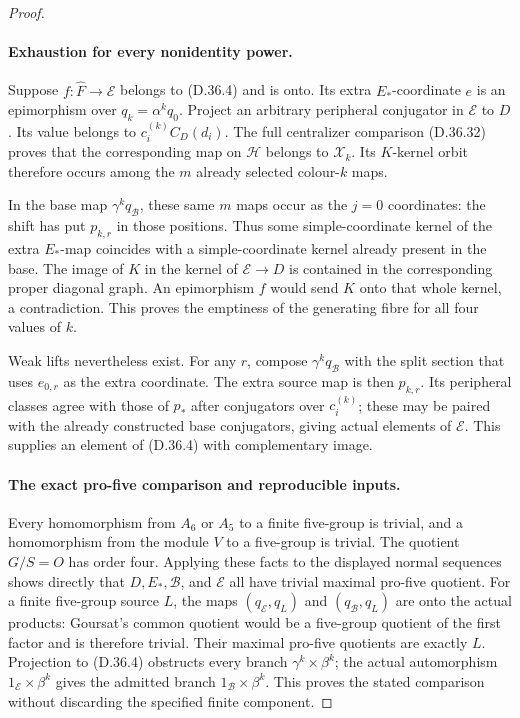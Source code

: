 \begin{proof}
\paragraph{Exhaustion for every nonidentity power.}
Suppose \(f:\widehat F\to\mathcal E\) belongs to
\textup{(D.36.4)} and is onto.  Its extra
\(E_*\)-coordinate \(e\) is an epimorphism over
\(q_k=\alpha^kq_0\).  Project an arbitrary
peripheral conjugator in \(\mathcal E\) to
\(D\).  Its value belongs to
\(c_i^{(k)}C_D(d_i)\).
The full centralizer comparison
\textup{(D.36.32)} proves that the corresponding
map on \(\mathcal H\) belongs to
\(\mathscr X_k\).  Its \(K\)-kernel orbit
therefore occurs among the \(m\) already selected
colour-\(k\) maps.

In the base map \(\gamma^kq_{\mathcal B}\),
these same \(m\) maps occur as the \(j=0\)
coordinates: the shift has put \(p_{k,r}\)
in those positions.  Thus some simple-coordinate
kernel of the extra \(E_*\)-map coincides with
a simple-coordinate kernel already present
in the base.  The image of \(K\) in the
kernel of \(\mathcal E\to D\) is contained in
the corresponding proper diagonal graph.
An epimorphism \(f\) would send \(K\) onto
that whole kernel, a contradiction.
This proves the emptiness of the generating
fibre for all four values of \(k\).

Weak lifts nevertheless exist.  For any
\(r\), compose \(\gamma^kq_{\mathcal B}\)
with the split section that uses \(e_{0,r}\)
as the extra coordinate.  The extra source
map is then \(p_{k,r}\).  Its peripheral
classes agree with those of \(p_*\) after
conjugators over \(c_i^{(k)}\); these may
be paired with the already constructed
base conjugators, giving actual elements
of \(\mathcal E\).
This supplies an element of
\textup{(D.36.4)} with complementary image.

\paragraph{The exact pro-five comparison and reproducible inputs.}
Every homomorphism from \(A_6\) or \(A_5\)
to a finite five-group is trivial, and a
homomorphism from the module \(V\) to a
five-group is trivial.  The quotient
\(G/S=O\) has order four.  Applying these
facts to the displayed normal sequences
shows directly that \(D,E_*,\mathcal B\),
and \(\mathcal E\) all have trivial maximal
pro-five quotient.
For a finite five-group source \(L\),
the maps \((q_{\mathcal E},q_L)\) and
\((q_{\mathcal B},q_L)\) are onto the
actual products: Goursat's common quotient
would be a five-group quotient of the first
factor and is therefore trivial.
Their maximal pro-five quotients are
exactly \(L\).  Projection to
\textup{(D.36.4)} obstructs every branch
\(\gamma^k\times\beta^k\); the actual
automorphism \(1_{\mathcal E}\times\beta^k\)
gives the admitted branch
\(1_{\mathcal B}\times\beta^k\).
This proves the stated comparison without
discarding the specified finite component.


\end{proof}
